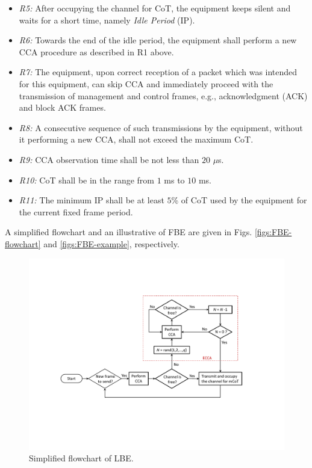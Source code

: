\begin{itemize}
\begin{itemize}
	\item
	\textit{R5:} After occupying the channel for CoT, the equipment keeps silent and waits for a short time, namely \textit{Idle Period} (IP).
	
	\item
	\textit{R6:} Towards the end of the idle period, the equipment shall perform a new CCA procedure as described in R1 above.
	
	\item
	\textit{R7:} The equipment, upon correct reception of a packet which was intended for this equipment, can skip CCA and immediately proceed with the transmission of management and control frames, e.g., acknowledgment (ACK) and block ACK frames.
	
	\item
	\textit{R8:}
	A consecutive sequence of such transmissions by the equipment, without it performing a new CCA, shall not exceed the maximum CoT.
	
	\item
	\textit{R9:}
	CCA observation time shall be not less than $20$ $\mu$s.
	
	\item
	\textit{R10:} CoT shall be in the range from $1$ ms to $10$ ms.
	
	\item
	\textit{R11:}
	The minimum IP shall be at least $5$\% of CoT used by the equipment for the current fixed frame period.
	
\end{itemize}

A simplified flowchart and an illustrative of FBE are given in Figs. \ref{figs:FBE-flowchart} and \ref{figs:FBE-example}, respectively.


\begin{figure}[!t]
	\centering
	\includegraphics[width=0.9\columnwidth]{figures2/LBE-flowchart}
	\caption{Simplified flowchart of LBE.}
	\label{figs:LBE-flowchart}
\end{figure}


\end{itemize}
